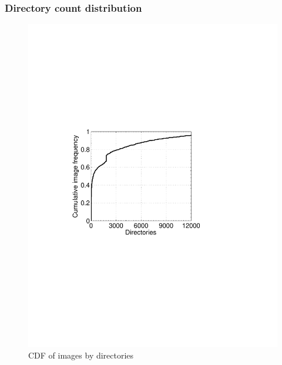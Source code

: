 \subsubsection{Directory count distribution}

\begin{figure}
	\centering
	\begin{minipage}{0.27\textwidth}
		\centering
		\includegraphics[width=1\textwidth]{graphs/dir.pdf}
		\caption{CDF of images by directories}
		\label{fig-dir}
	\end{minipage}%
	\begin{minipage}{0.23\textwidth}
		\centering

\end{minipage}
\end{figure}
